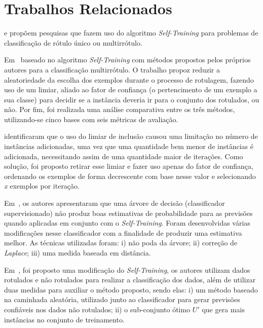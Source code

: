 \section{Trabalhos Relacionados}
    \label{sec:related-works}
    
     e  propõem pesquisas que fazem uso do algoritmo \textit{Self\hyp{Training}} para problemas de classificação de rótulo único ou multirrótulo.
    
    Em~ baseado no algoritmo \textit{Self\hyp{Training}} com métodos propostos pelos próprios autores para a classificação multirrótulo. O trabalho propoz reduzir a aleatoriedade da escolha dos exemplos durante o processo de rotulagem, fazendo uso de um limiar, aliado ao fator de confiança (o pertencimento de um exemplo a sua classe) para decidir se a instância deveria ir para o conjunto dos rotulados, ou não. Por fim, foi realizada uma análise comparativa entre os três métodos, utilizando\hyp{se} cinco bases com seis métricas de avaliação. 
    
     identificaram que o uso do limiar de inclusão causou uma limitação no número de instâncias adicionadas, uma vez que uma quantidade bem menor de instâncias é adicionada, necessitando assim de uma quantidade maior de iterações. Como solução, foi proposto retirar esse limiar e fazer uso apenas do fator de confiança, ordenando os exemplos de forma decrescente com base nesse valor e selecionando \textit{x} exemplos por iteração.
    
    Em~, os autores apresentaram que uma árvore de decisão (classificador supervisionado) não produz boas estimativas de probabilidade para as previsões quando aplicadas em conjunto com o \textit{Self\hyp{Training}}. Foram desenvolvidas várias modificações nesse classificador com a finalidade de produzir uma estimativa melhor. As técnicas utilizadas foram: i) não poda da árvore; ii) correção de \textit{Laplace}; iii) uma medida baseada em distância. 
    
    Em~, foi proposto uma modificação do \textit{Self\hyp{Training}}, os autores utilizam dados rotulados e não rotulados para realizar a classificação dos dados, além de utilizar duas medidas para auxiliar o método proposto, sendo elas: i) um método baseado na caminhada aleatória, utilizado junto ao classificador para gerar previsões confiáveis nos dados não rotulados; ii) o sub\hyp{conjunto} ótimo $U'$ que gera mais instâncias no conjunto de treinamento.
    
